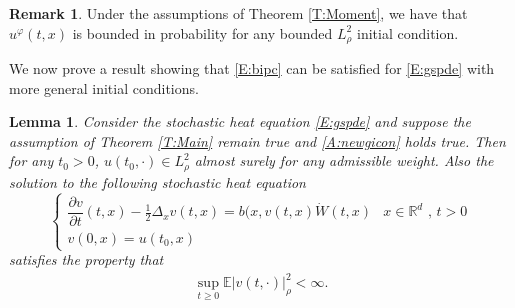 \documentclass[a4paper,11pt]{article}%
\numberwithin{equation}{section}
\theoremstyle{plain}
\newtheorem{lemma}[theorem]{Lemma}
\theoremstyle{definition}
\newtheorem{remark}[theorem]{Remark}
\newcommand{\R}{\mathbb{R}}
\newcommand{\E}{\mathbb{E}}
\begin{document}
\begin{remark} Under the assumptions of Theorem \ref{T:Moment}, we have that $u^\varphi(t,x)$ is bounded in probability for any bounded $L^2_\rho$ initial condition.
\end{remark}
We now prove a result showing that \eqref{E:bipc} can be satisfied for \eqref{E:gspde} with more general initial conditions.

\begin{lemma}
	\label{L:Moments}
	Consider the stochastic heat equation \eqref{E:gspde} and suppose the assumption of Theorem \ref{T:Main} remain true and \eqref{A:newgicon} holds true. Then for any $t_0>0$, $u(t_0,\cdot)\in L^2_\rho$ almost surely for any admissible weight. Also the solution to the following stochastic heat equation
 \begin{equation}
	\label{E:vspde2}
	 \begin{cases}
	 \dfrac{\partial v}{\partial t}(t,x)-\frac{1}{2}\Delta_x v(t,x) = b(x,v(t,x)\dot W(t,x) & \text{$x\in \R^d$ , $t>0$}
	 \\ v(0,x) = u(t_0,x)  &
	 \end{cases}
 \end{equation}
satisfies the property that
\begin{align*}
	 \sup_{t\ge 0} \E |v(t,\cdot)|_\rho^2 < \infty.
\end{align*}
\end{lemma}
\end{document}
